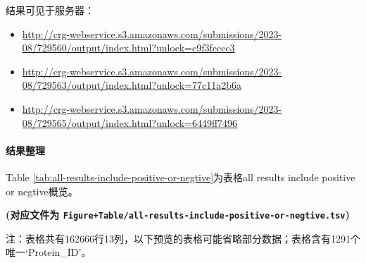 \documentclass[
]{article}
\providecommand{\tightlist}{%
  \setlength{\itemsep}{0pt}\setlength{\parskip}{0pt}}
\begin{document}
结果可见于服务器：

\begin{itemize}
\tightlist
\item
  \url{http://crg-webservice.s3.amazonaws.com/submissions/2023-08/729560/output/index.html?unlock=c9f3fccec3}
\item
  \url{http://crg-webservice.s3.amazonaws.com/submissions/2023-08/729563/output/index.html?unlock=77c11a2b6a}
\item
  \url{http://crg-webservice.s3.amazonaws.com/submissions/2023-08/729565/output/index.html?unlock=6449ff7496}
\end{itemize}

\hypertarget{ux7ed3ux679cux6574ux7406}{%
\paragraph{结果整理}\label{ux7ed3ux679cux6574ux7406}}

Table \ref{tab:all-results-include-positive-or-negtive}为表格all results include positive or negtive概览。

\textbf{(对应文件为 \texttt{Figure+Table/all-results-include-positive-or-negtive.tsv})}

\begin{center}\begin{tcolorbox}[colback=gray!10, colframe=gray!50, width=0.9\linewidth, arc=1mm, boxrule=0.5pt]注：表格共有162666行13列，以下预览的表格可能省略部分数据；表格含有1291个唯一`Protein\_ID'。
\end{tcolorbox}
\end{center}
\end{document}
